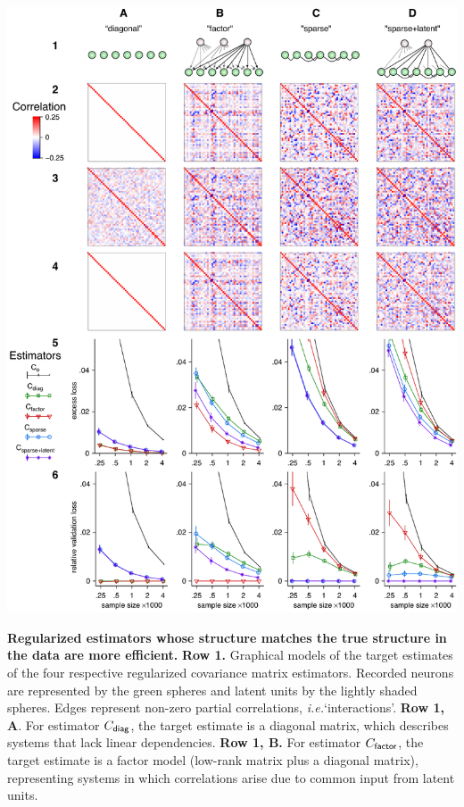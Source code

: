 \documentclass[10pt]{article}
\newcommand{\sq}[1]{\lq#1\rq}
\newcommand{\ie}{\emph{i.e.}\;}
\begin{document}
\begin{FPfigure}
    \begin{center}
        \includegraphics{./figures/Figure01.pdf}
    \end{center}
    \caption{{\bf Regularized estimators whose structure matches the true structure in the data are more efficient.}
    {\bf Row 1.} Graphical models of the target estimates of the four respective regularized covariance matrix estimators.  Recorded neurons are represented by the green spheres and latent units by the lightly shaded spheres.  Edges represent non-zero partial correlations, \ie \sq{interactions}.
        {\bf Row 1, A}.  For estimator $C_{\sf diag}$, the target estimate is a diagonal matrix, which describes systems that lack linear dependencies. 
        {\bf  Row 1, B.} For estimator $C_{\sf factor}$, the target estimate is a factor model (low-rank matrix plus a diagonal matrix), representing systems in which correlations arise due to common input from latent units. 
}
\end{FPfigure}
\end{document}
